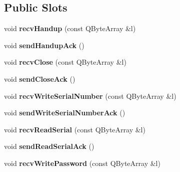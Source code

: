\subsection*{Public Slots}
\begin{DoxyCompactItemize}
\item 
\mbox{\label{class_q_q_t_user_serial_protocol_ad3824023155d177c7e113adf62390be1}} 
void {\bfseries recv\+Handup} (const Q\+Byte\+Array \&l)
\item 
\mbox{\label{class_q_q_t_user_serial_protocol_ae2d7e5512f9be6c31f642b07659bc957}} 
void {\bfseries send\+Handup\+Ack} ()
\item 
\mbox{\label{class_q_q_t_user_serial_protocol_a88091997dd6117c5d90135e1a66a88bd}} 
void {\bfseries recv\+Close} (const Q\+Byte\+Array \&l)
\item 
\mbox{\label{class_q_q_t_user_serial_protocol_addf285333b724f705200f53d2a9de5a2}} 
void {\bfseries send\+Close\+Ack} ()
\item 
\mbox{\label{class_q_q_t_user_serial_protocol_a5b26cb05d525aa8865e695848497603f}} 
void {\bfseries recv\+Write\+Serial\+Number} (const Q\+Byte\+Array \&l)
\item 
\mbox{\label{class_q_q_t_user_serial_protocol_ac933c46abf990df72068dbb9f3efcfa5}} 
void {\bfseries send\+Write\+Serial\+Number\+Ack} ()
\item 
\mbox{\label{class_q_q_t_user_serial_protocol_a18c8f9ea1a77fad687bd464ae23baf97}} 
void {\bfseries recv\+Read\+Serial} (const Q\+Byte\+Array \&l)
\item 
\mbox{\label{class_q_q_t_user_serial_protocol_a3bb8d376e787f04ce270bab9f5e60a81}} 
void {\bfseries send\+Read\+Serial\+Ack} ()
\item 
\mbox{\label{class_q_q_t_user_serial_protocol_ad28a4898b2ee0a3280b10466e2057085}} 
void {\bfseries recv\+Write\+Password} (const Q\+Byte\+Array \&l)

\end{DoxyCompactItemize}
